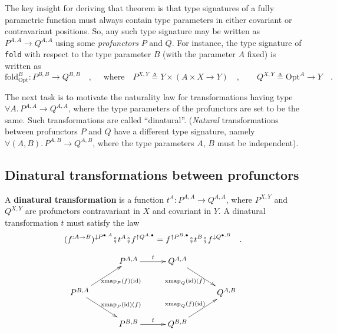 The key insight for deriving that theorem is that type signatures
of a fully parametric function must always contain type parameters
in either covariant or contravariant positions. So, any such type
signature may be written as $P^{A,A}\rightarrow Q^{A,A}$ using some
\emph{profunctors} $P$ and $Q$. For instance, the type signature
of \lstinline!fold! with respect to the type parameter $B$ (with
the parameter $A$ fixed) is written as
\begin{equation}
\text{fold}_{\text{Opt}}^{B}:P^{B,B}\rightarrow Q^{B,B}\quad,\quad\text{ where}\quad P^{X,Y}\triangleq Y\times\left(A\times X\rightarrow Y\right)\quad,\quad\quad Q^{X,Y}\triangleq\text{Opt}^{A}\rightarrow Y\quad.\label{eq:fold-type-signature-via-profunctors-derivation1}
\end{equation}

The next task is to motivate the naturality law for transformations
having type $\forall A.\,P^{A,A}\rightarrow Q^{A,A}$, where the type
parameters of the profunctors are set to be the same. Such transformations
are called \textsf{``}dinatural\textsf{''}. (\emph{Natural} transformations between
profunctors $P$ and $Q$ have a different type signature, namely
$\forall(A,B).\,P^{A,B}\rightarrow Q^{A,B}$, where the type parameters
$A$, $B$ must be independent).

\subsection{Dinatural transformations between profunctors}

A \textbf{dinatural transformation}
is a function $t^{A}:P^{A,A}\rightarrow Q^{A,A}$, where $P^{X,Y}$
and $Q^{X,Y}$ are profunctors contravariant in $X$ and covariant
in $Y$. A dinatural transformation $t$ must satisfy the law
\begin{equation}
(f^{:A\rightarrow B})^{\downarrow P^{\bullet,A}}\bef t^{A}\bef f^{\uparrow Q^{A,\bullet}}=f^{\uparrow P^{B,\bullet}}\bef t^{B}\bef f^{\downarrow Q^{\bullet,B}}\quad.\label{eq:dinaturality-law-for-dinatural-transformations-of-profunctors}
\end{equation}

\begin{wrapfigure}{l}{0.43\columnwidth}%
\vspace{-2\baselineskip}
\[
\xymatrix{\xyScaleY{1.8pc}\xyScaleX{2.5pc} & P^{A,A}\ar[r]\sp(0.5){t} & Q^{A,A}\ar[rd]\sb(0.45){\text{xmap}_{Q}(\text{id})(f)}\\
P^{B,A}\ar[rd]\sp(0.55){\text{xmap}_{P}(\text{id})(f)}\ar[ru]\sb(0.55){\text{xmap}_{P}(f)(\text{id})} &  &  & Q^{A,B}\\
 & P^{B,B}\ar[r]\sp(0.5){t} & Q^{B,B}\ar[ru]\sp(0.45){\text{xmap}_{Q}(f)(\text{id})}
}
\]

\vspace{-0.7\baselineskip}
\end{wrapfigure}%

